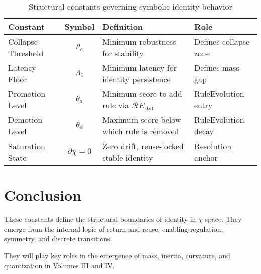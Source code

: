 \begin{table}[h!]
\centering
\begin{tabular}{|l|c|l|l|}
\hline
\textbf{Constant} & \textbf{Symbol} & \textbf{Definition} & \textbf{Role} \\
\hline
Collapse Threshold     & $\rho_c$         & Minimum robustness for stability     & Defines collapse zone \\
Latency Floor          & $\Lambda_0$      & Minimum latency for identity persistence & Defines mass gap \\
Promotion Level        & $\theta_a$       & Minimum score to add rule via $\mathcal{R}E_{\text{stat}}$ & RuleEvolution entry \\
Demotion Level         & $\theta_d$       & Maximum score below which rule is removed & RuleEvolution decay \\
Saturation State       & $\partial\chi = 0$ & Zero drift, reuse-locked stable identity & Resolution anchor \\
\hline
\end{tabular}
\caption{Structural constants governing symbolic identity behavior}
\end{table}

\section{Conclusion} \label{conclusion}

These constants define the structural boundaries of identity in $\chi$-space. They emerge from the internal logic of return and reuse, enabling regulation, symmetry, and discrete transitions.

\medskip

They will play key roles in the emergence of mass, inertia, curvature, and quantization in Volumes III and IV.

